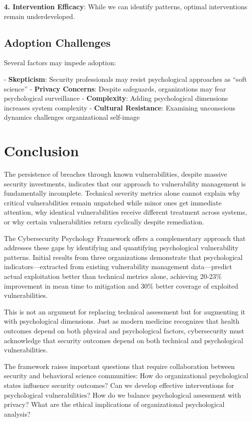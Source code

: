 \documentclass[11pt,a4paper]{article}
\begin{document}
\textbf{4. Intervention Efficacy}: While we can identify patterns, optimal interventions remain underdeveloped.

\subsection{Adoption Challenges}

Several factors may impede adoption:

- \textbf{Skepticism}: Security professionals may resist psychological approaches as ``soft science''
- \textbf{Privacy Concerns}: Despite safeguards, organizations may fear psychological surveillance
- \textbf{Complexity}: Adding psychological dimensions increases system complexity
- \textbf{Cultural Resistance}: Examining unconscious dynamics challenges organizational self-image

\section{Conclusion}

The persistence of breaches through known vulnerabilities, despite massive security investments, indicates that our approach to vulnerability management is fundamentally incomplete. Technical severity metrics alone cannot explain why critical vulnerabilities remain unpatched while minor ones get immediate attention, why identical vulnerabilities receive different treatment across systems, or why certain vulnerabilities return cyclically despite remediation.

The Cybersecurity Psychology Framework offers a complementary approach that addresses these gaps by identifying and quantifying psychological vulnerability patterns. Initial results from three organizations demonstrate that psychological indicators—extracted from existing vulnerability management data—predict actual exploitation better than technical metrics alone, achieving 20-23\% improvement in mean time to mitigation and 30\% better coverage of exploited vulnerabilities.

This is not an argument for replacing technical assessment but for augmenting it with psychological dimensions. Just as modern medicine recognizes that health outcomes depend on both physical and psychological factors, cybersecurity must acknowledge that security outcomes depend on both technical and psychological vulnerabilities.

The framework raises important questions that require collaboration between security and behavioral science communities: How do organizational psychological states influence security outcomes? Can we develop effective interventions for psychological vulnerabilities? How do we balance psychological assessment with privacy? What are the ethical implications of organizational psychological analysis?
\end{document}
